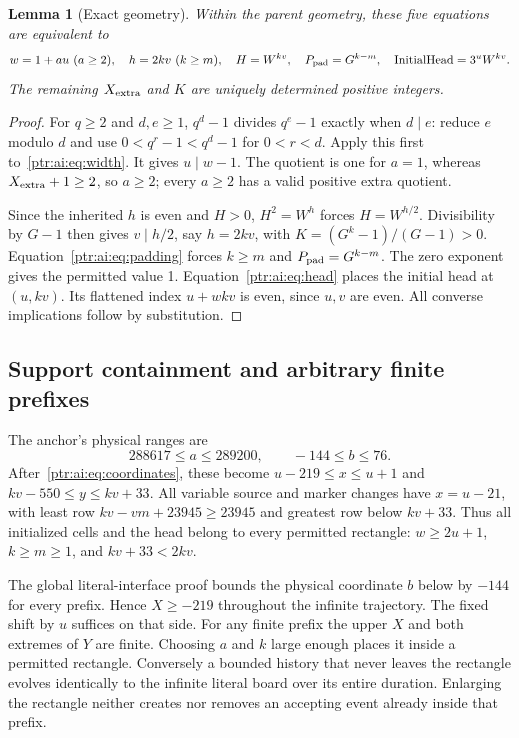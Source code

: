 \documentclass[11pt,letterpaper]{article}
\newtheorem{lemma}[theorem]{Lemma}
\theoremstyle{definition}\newtheorem{definition}[theorem]{Definition}
\theoremstyle{remark}\newtheorem{remark}[theorem]{Remark}
\begin{document}
\begin{lemma}[Exact geometry]\label{ptr:ai:lem:geometry}
Within the parent geometry, these five equations are equivalent to
\[
 w=1+au\ (a\ge2),\quad h=2kv\ (k\ge m),\quad
 H=W^{kv},\quad P_{\rm pad}=G^{k-m},\quad \mathrm{InitialHead}=3^uW^{kv}.
\]
The remaining $X_{\rm extra}$ and $K$ are uniquely determined positive integers.
\end{lemma}
\begin{proof}
For $q\ge2$ and $d,e\ge1$, $q^d-1$ divides $q^e-1$ exactly when $d\mid e$: reduce $e$ modulo $d$ and use $0<q^r-1<q^d-1$ for $0<r<d$. Apply this first to~\eqref{ptr:ai:eq:width}. It gives $u\mid w-1$. The quotient is one for $a=1$, whereas $X_{\rm extra}+1\ge2$, so $a\ge2$; every $a\ge2$ has a valid positive extra quotient.

Since the inherited $h$ is even and $H>0$, $H^2=W^h$ forces $H=W^{h/2}$. Divisibility by $G-1$ then gives $v\mid h/2$, say $h=2kv$, with $K=(G^k-1)/(G-1)>0$. Equation~\eqref{ptr:ai:eq:padding} forces $k\ge m$ and $P_{\rm pad}=G^{k-m}$. The zero exponent gives the permitted value 1. Equation~\eqref{ptr:ai:eq:head} places the initial head at $(u,kv)$. Its flattened index $u+wkv$ is even, since $u,v$ are even. All converse implications follow by substitution.
\end{proof}

\subsection{Support containment and arbitrary finite prefixes}
The anchor's physical ranges are
\[
 288617\le a\le289200,\qquad -144\le b\le76.
\]
After~\eqref{ptr:ai:eq:coordinates}, these become $u-219\le x\le u+1$ and $kv-550\le y\le kv+33$. All variable source and marker changes have $x=u-21$, with least row $kv-vm+23945\ge23945$ and greatest row below $kv+33$. Thus all initialized cells and the head belong to every permitted rectangle: $w\ge2u+1$, $k\ge m\ge1$, and $kv+33<2kv$.

The global literal-interface proof bounds the physical coordinate $b$ below by $-144$ for every prefix. Hence $X\ge-219$ throughout the infinite trajectory. The fixed shift by $u$ suffices on that side. For any finite prefix the upper $X$ and both extremes of $Y$ are finite. Choosing $a$ and $k$ large enough places it inside a permitted rectangle. Conversely a bounded history that never leaves the rectangle evolves identically to the infinite literal board over its entire duration. Enlarging the rectangle neither creates nor removes an accepting event already inside that prefix.
\end{document}
